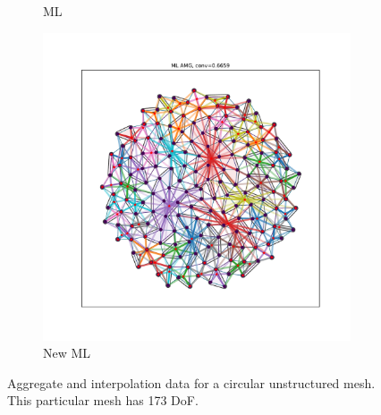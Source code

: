 \documentclass{article}
\begin{document}
\begin{figure}[h]
\begin{subfigure}[t]{0.32\textwidth}
    \caption{ML}
  \end{subfigure}
  \begin{subfigure}[t]{0.32\textwidth}
    \centering
    \includegraphics[width=\textwidth, trim=80 70 70 50, clip]{grid_circle_new.pdf}
    \caption{New ML}
  \end{subfigure}
  \caption{Aggregate and interpolation data for a circular unstructured mesh.  This particular mesh has 173 DoF.}
  \label{fig:gridcircle}
\end{figure}
\end{document}
